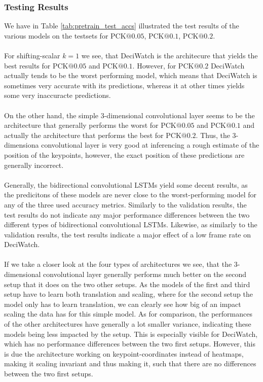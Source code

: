 \documentclass[./main.tex]{subfiles}
\begin{document}
\subsubsection{Testing Results}
We have in Table \ref{tab:pretrain_test_accs} illustrated the test results of the various models on the testsets for PCK$@0.05$, PCK$@0.1$, PCK$@0.2$.
\\
\\
For shifting-scalar $k = 1$ we see, that DeciWatch is the architecure that yields the best results for PCK$@0.05$ and PCK$@0.1$. However, for PCK$@0.2$ DeciWatch actually tends to be the worst performing model, which means that DeciWatch is sometimes very accurate with its predictions, whereas it at other times yields some very inaccuracte predictions.
\\
\\
On the other hand, the simple 3-dimensional convolutional layer seems to be the architecture that generally performs the worst for PCK$@0.05$ and PCK$@0.1$ and actually the architecture that performs the best for PCK$@0.2$. Thus, the 3-dimensiona convolutional layer is very good at inferencing a rough estimate of the position of the keypoints, however, the exact position of these predictions are generally incorrect.
\\
\\
Generally, the bidirectional convolutional LSTMs yield some decent results, as the predicitons of these models are never close to the worst-performing model for any of the three used accuracy metrics. Similarly to the validation results, the test results do not indicate any major performance differences between the two different types of bidirectional convolutional LSTMs. Likewise, as similarly to the validation results, the test results indicate a major effect of a low frame rate on DeciWatch. 
\\
\\
If we take a closer look at the four types of architectures we see, that the 3-dimensional convolutional layer generally performs much better on the second setup that it does on the two other setups. As the models of the first and third setup have to learn both translation and scaling, where for the second setup the model only has to learn translation, we can clearly see how big of an impact scaling the data has for this simple model. As for comparison, the performances of the other architectures have generally a lot smaller variance, indicating these models being less impacted by the setup. This is especially visible for DeciWatch, which has no performance differences between the two first setups. However, this is due the architecture working on keypoint-coordinates instead of heatmaps, making it scaling invariant and thus making it, such that there are no differences between the two first setups.
\end{document}
